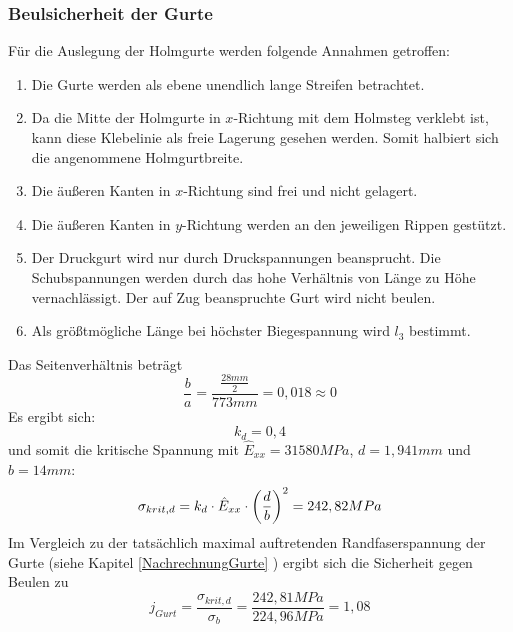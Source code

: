\subsubsection{Beulsicherheit der Gurte}
Für die Auslegung der Holmgurte werden folgende Annahmen getroffen:
\begin{enumerate}
	\item Die Gurte werden als ebene unendlich lange Streifen betrachtet.
	\item Da die Mitte der Holmgurte in $x$-Richtung mit dem Holmsteg verklebt ist, kann diese Klebelinie als freie Lagerung gesehen werden. Somit halbiert sich die angenommene Holmgurtbreite.
	\item Die äußeren Kanten in $x$-Richtung sind frei und nicht gelagert.
	\item Die äußeren Kanten in $y$-Richtung werden an den jeweiligen Rippen gestützt.
	\item Der Druckgurt wird nur durch Druckspannungen beansprucht. Die Schubspannungen werden durch das hohe Verhältnis von Länge zu  Höhe vernachlässigt. Der auf Zug beanspruchte Gurt wird nicht beulen.
	\item Als größtmögliche Länge bei höchster Biegespannung wird $l_{3}$ bestimmt.
\end{enumerate}
Das Seitenverhältnis beträgt 
\begin{equation}
	\frac{b}{a}=\frac{\frac{28 mm}{2}}{773 mm}=0,018 \approx 0
\end{equation}
\noindent Es ergibt sich:
\begin{equation}
	k_{d}=0,4
\end{equation}
und somit die kritische Spannung mit $\hat{E}_{xx}=31580MPa$, $d=1,941mm$ und $b=14mm$:
\begin{equation}
	\sigma_{krit,d}=k_{d}\cdot \hat{E}_{xx}\cdot\biggl(\frac{d}{b}\biggr)^{2}\\
	= 242,82 MPa
\end{equation}
Im Vergleich zu der tatsächlich maximal auftretenden Randfaserspannung der Gurte (siehe Kapitel \ref{NachrechnungGurte} ) ergibt sich die Sicherheit gegen Beulen zu 
\begin{equation}
	j_{Gurt}=\frac{\sigma_{krit,d}}{\sigma_{b}}=\frac{242,81 MPa}{224,96 MPa}=1,08
\end{equation}



